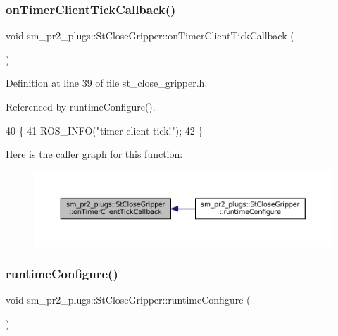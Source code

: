 \subsubsection{\texorpdfstring{on\+Timer\+Client\+Tick\+Callback()}{onTimerClientTickCallback()}}
{\footnotesize\ttfamily void sm\+\_\+pr2\+\_\+plugs\+::\+St\+Close\+Gripper\+::on\+Timer\+Client\+Tick\+Callback (\begin{DoxyParamCaption}{ }\end{DoxyParamCaption})\hspace{0.3cm}{\ttfamily [inline]}}



Definition at line 39 of file st\+\_\+close\+\_\+gripper.\+h.



Referenced by runtime\+Configure().


\begin{DoxyCode}
40     \{
41         ROS\_INFO(\textcolor{stringliteral}{"timer client tick!"});
42     \}
\end{DoxyCode}
Here is the caller graph for this function\+:
\nopagebreak
\begin{figure}[H]
\begin{center}
\leavevmode
\includegraphics[width=350pt]{structsm__pr2__plugs_1_1StCloseGripper_a05a1de398b611d66e20f3595c6f0f8a6_icgraph}
\end{center}
\end{figure}
\mbox{\label{structsm__pr2__plugs_1_1StCloseGripper_aaad13a14b27b9e31bd14aa932c191d57}} 
\subsubsection{\texorpdfstring{runtime\+Configure()}{runtimeConfigure()}}
{\footnotesize\ttfamily void sm\+\_\+pr2\+\_\+plugs\+::\+St\+Close\+Gripper\+::runtime\+Configure (\begin{DoxyParamCaption}{ }\end{DoxyParamCaption})\hspace{0.3cm}{\ttfamily [inline]}}




